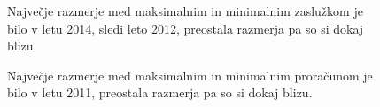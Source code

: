 \documentclass[11pt,a4paper]{article}
\begin{document}
\pagebreak
\begin{figure}[H]

\caption{Največje razmerje med maksimalnim in minimalnim zaslužkom je bilo v letu 2014, sledi leto 2012, preostala razmerja pa so si dokaj blizu.}
\end{figure}

\pagebreak
\begin{figure}[H]

\caption{Največje razmerje med maksimalnim in minimalnim proračunom je bilo v letu 2011, preostala razmerja pa so si dokaj blizu.}
\end{figure}

\pagebreak
\begin{center}
\end{center}
\end{document}
